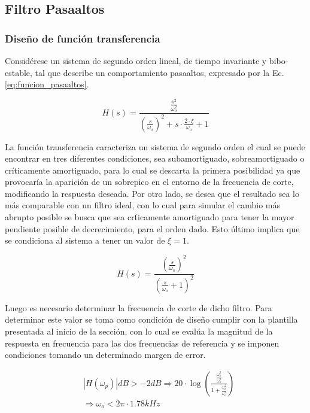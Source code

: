 \subsection{Filtro Pasaaltos}

\subsubsection{Dise\~no de funci\'on transferencia}
Consid\'erese un sistema de segundo orden lineal, de tiempo invariante y bibo-estable, tal que describe un comportamiento
pasaaltos, expresado por la Ec. \ref{eq:funcion_pasaaltos}.

\begin{equation}
    H(s) = \frac{ \frac{s^{2}}{\omega_o^{2}} }{\left(\frac{s}{\omega_o}\right)^{2} + s \cdot \frac{2 \cdot \xi}{\omega_o} + 1}
\end{equation}

La funci\'on transferencia caracteriza un sistema de segundo orden el cual se puede encontrar en tres diferentes condiciones, sea subamortiguado, sobreamortiguado o cr\'iticamente amortiguado,
para lo cual se descarta la primera posibilidad ya que provocar\'ia la aparici\'on de un sobrepico en el entorno de la frecuencia de corte, modificando la respuesta deseada. Por otro lado, se desea que el resultado
sea lo m\'as comparable con un filtro ideal, con lo cual para simular el cambio m\'as abrupto posible se busca que sea cr\'ticamente amortiguado para tener la mayor pendiente posible de decrecimiento, para el orden dado.
Esto \'ultimo implica que se condiciona al sistema a tener un valor de $\xi = 1$.

\begin{equation}
    H(s) = \frac{\left(\frac{s}{\omega_o}\right)^{2}}{\left(\frac{s}{\omega_o} + 1\right)^{2}}
    \label{eq:funcion_pasaaltos}
\end{equation}

Luego es necesario determinar la frecuencia de corte de dicho filtro. Para determinar este valor se toma como condici\'on de dise\~no cumplir con la plantilla presentada al inicio de la secci\'on, con lo cual
se eval\'ua la magnitud de la respuesta en frecuencia para las dos frecuencias de referencia y se imponen condiciones tomando un determinado margen de error.

\begin{eqnarray*}
    & |H(\omega_p)|dB > -2dB \Rightarrow 20 \cdot \log{\left( \frac{\frac{\omega_p^{2}}{\omega_o^{2}}}{1 + \frac{\omega_p^{2}}{\omega_o^{2}}} \right)} \\
    & \Rightarrow \omega_o < 2\pi \cdot 1.78kHz 
\end{eqnarray*}

